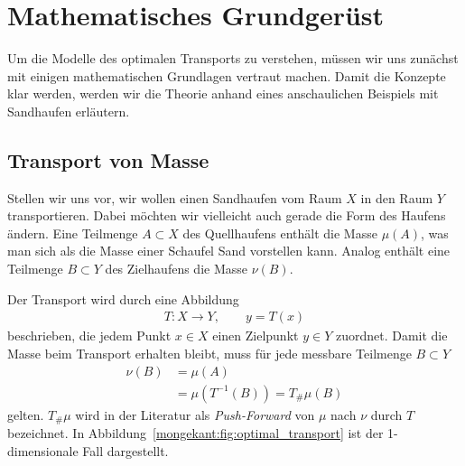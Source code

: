 %
%
%
%
\section{Mathematisches Grundgerüst\label{mongekant:section:teil0}}

Um die Modelle des optimalen Transports zu verstehen,
müssen wir uns zunächst mit einigen mathematischen Grundlagen vertraut machen.
Damit die Konzepte klar werden,
werden wir die Theorie anhand eines anschaulichen Beispiels mit Sandhaufen erläutern.
%

\subsection{Transport von Masse\label{mongekant:subection:transport}}
Stellen wir uns vor,
wir wollen einen Sandhaufen vom Raum $X$
in den Raum $Y$ transportieren.
Dabei möchten wir vielleicht auch gerade die Form des Haufens ändern.
Eine Teilmenge $A\subset X$ des Quellhaufens enthält die Masse $\mu(A)$,
was man sich als die Masse einer Schaufel Sand vorstellen kann.
Analog enthält eine Teilmenge $B\subset Y$ des Zielhaufens die Masse $\nu(B)$.

Der Transport wird durch eine Abbildung
\begin{align*}
T\colon X\to Y
,\qquad y=T(x)
\end{align*}
beschrieben,
die jedem Punkt $x\in X$ einen Zielpunkt $y\in Y$ zuordnet.
Damit die Masse beim Transport erhalten bleibt,
muss für jede messbare Teilmenge $B\subset Y$
\begin{align*}
\nu(B)
&=
\mu(A)
\\
&=
\mu\left(T^{-1}(B)\right)
=
T_{\#}\mu(B)
\end{align*}
gelten.
$T_{\#}\mu$ wird in der Literatur als \emph{Push-Forward} von $\mu$ nach $\nu$ durch $T$ bezeichnet.
%
In Abbildung~\ref{mongekant:fig:optimal_transport} ist der 1-dimensionale Fall dargestellt.


